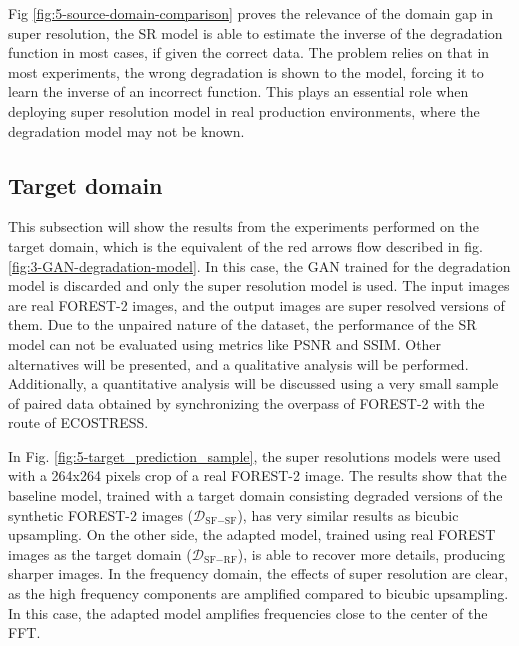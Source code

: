         Fig \ref{fig:5-source-domain-comparison} proves the relevance of the domain gap in super resolution, the SR model is able to estimate the inverse of the degradation function in most cases, if given the correct data.
        The problem relies on that in most experiments, the wrong degradation is shown to the model, forcing it to learn the inverse of an incorrect function.  
        This plays an essential role when deploying super resolution model in real production environments, where the degradation model may not be known. 

    \subsection{Target domain}

        This subsection will show the results from the experiments performed on the target domain, which is the equivalent of the red arrows flow described in fig. \ref{fig:3-GAN-degradation-model}.
        In this case, the GAN trained for the degradation model is discarded and only the super resolution model is used.
        The input images are real FOREST-2 images, and the output images are super resolved versions of them. 
        Due to the unpaired nature of the dataset, the performance of the SR model can not be evaluated using metrics like PSNR and SSIM. 
        Other alternatives will be presented, and a qualitative analysis will be performed. 
        Additionally, a quantitative analysis will be discussed using a very small sample of paired data obtained by synchronizing the overpass of FOREST-2 with the route of ECOSTRESS.


        In Fig. \ref{fig:5-target_prediction_sample}, the super resolutions models were used with a 264x264 pixels crop of a real FOREST-2 image.
        The results show that the baseline model, trained with a target domain consisting degraded versions of the synthetic FOREST-2 images ($\mathcal{D}_{\text{SF}-\text{SF}}$), has very similar results as bicubic upsampling.
        On the other side, the adapted model, trained using real FOREST images as the target domain ($\mathcal{D}_{\text{SF}-\text{RF}}$), is able to recover more details, producing sharper images.
        In the frequency domain, the effects of super resolution are clear, as the high frequency components are amplified compared to bicubic upsampling. 
        In this case, the adapted model amplifies frequencies close to the center of the FFT.
        
        


